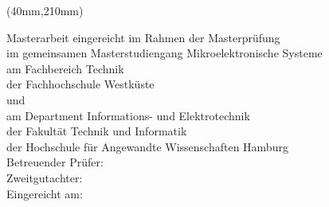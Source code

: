 
\newpage
\thispagestyle{empty} {
    \selectfont
    \hfuzz=20pt       %

  \vspace*{1cm}
  \begin{minipage}[b]{\textwidth}
    \fontsize{14pt}{20pt}
    \selectfont
    \begin{center}
      \IthesisAuthor
    \end{center}
  \end{minipage}

  \vspace{1.5cm}
  \begin{minipage}[b][0cm][t]{\textwidth}
    \fontsize{18pt}{20pt}
    \selectfont
    \begin{center}
      \IthesisTitle
  	\end{center}
  \end{minipage}

  \begin{textblock*}{\textwidth}(40mm,210mm)
    \begin{minipage}[b]{\textwidth}
      \selectfont
      \fontsize{12pt}{14pt}
      \selectfont
      Masterarbeit eingereicht im Rahmen der Masterprüfung \\
      im gemeinsamen Masterstudiengang Mikroelektronische Systeme\\
      am Fachbereich Technik\\
      der Fachhochschule Westküste\\
      und\\
      am Department Informations- und Elektrotechnik\\
      der Fakultät Technik und Informatik\\
      der Hochschule für Angewandte Wissenschaften Hamburg\\

      Betreuender Prüfer:   \IfirstSv \\
      Zweitgutachter:       \IsecondSv \\

      Eingereicht am:       \ISubDate \\
    \end{minipage}
  \end{textblock*}
}
